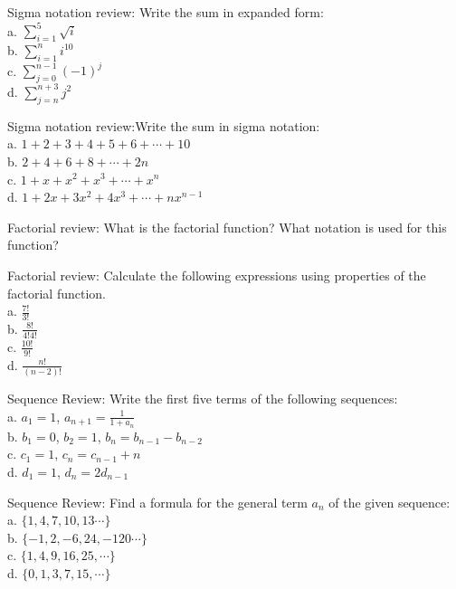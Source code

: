 \begin{exercise}
Sigma notation review: Write the sum in expanded form:\\
a. $\sum_{i=1}^5 \sqrt{i}$\\
b. $\sum_{i=1}^n i^{10}$\\
c. $\sum_{j=0}^{n-1} (-1)^j$\\
d. $\sum_{j=n}^{n+3} j^2$\\
\end{exercise}

\begin{exercise}
Sigma notation review:Write the sum in sigma notation:\\
a. $1+2+3+4+5+6+ \cdots + 10$\\
b. $2+4+6+8+ \cdots +2n$\\
c. $1+x+x^2 + x^3 + \cdots +x^n$\\
d. $1+2x+3x^2 + 4x^3 + \cdots +nx^{n-1}$\\
\end{exercise}

\begin{exercise}
Factorial review: What is the factorial function?  What notation is used for this function?
\end{exercise}

\begin{exercise}
Factorial review: Calculate the following expressions using properties of the factorial function.\\
a. $\frac{7!}{3!}$ \\
b. $\frac{8!}{4!4!}$ \\
c. $\frac{10!}{9!}$ \\
d. $\frac{n!}{(n-2)!}$ 
\end{exercise}

\begin{exercise}
Sequence Review: Write the first five terms of the following sequences:\\
a. $a_1=1$, $a_{n+1}=\frac{1}{1+a_n}$ \\
b. $b_1=0$, $b_2=1$, $b_{n}=b_{n-1}-b_{n-2}$\\
c. $c_1=1$, $c_n=c_{n-1}+n$\\
d. $d_1=1$, $d_n=2d_{n-1}$
\end{exercise}

\begin{exercise}
Sequence Review: Find a formula for the general term $a_n$ of the given sequence:\\
a. $\{1, 4, 7, 10, 13\cdots \}$ \\
b. $\{ -1, 2, -6, 24, -120 \cdots\}$\\
c. $\{ 1, 4, 9,16, 25, \cdots\}$\\
d. $\{ 0, 1, 3,7, 15, \cdots\}$
\end{exercise}
